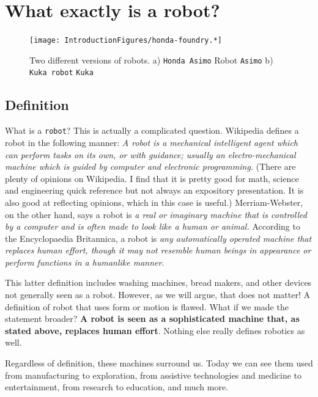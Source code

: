 \hypertarget{what-exactly-is-a-robot}{%
\section{What exactly is a robot?}\label{what-exactly-is-a-robot}}

\begin{figure}
\centering
\texttt{[image: IntroductionFigures/honda-foundry.*]}
\caption{Two different versions of robots. a) \texttt{Honda\ Asimo}
Robot \texttt{Asimo} b) \texttt{Kuka\ robot} \texttt{Kuka}}
\end{figure}

\hypertarget{definition}{%
\subsection{Definition}\label{definition}}

What is a \texttt{robot}? This is actually a complicated question.
Wikipedia defines a robot in the following manner: \emph{A robot is a
mechanical intelligent agent which can perform tasks on its own, or with
guidance; usually an electro-mechanical machine which is guided by
computer and electronic programming.} (There are plenty of opinions on
Wikipedia. I find that it is pretty good for math, science and
engineering quick reference but not always an expository presentation.
It is also good at reflecting opinions, which in this case is useful.)
Merriam-Webster, on the other hand, says a robot is \emph{a real or
imaginary machine that is controlled by a computer and is often made to
look like a human or animal.} According to the Encyclopaedia Britannica,
a robot is \emph{any automatically operated machine that replaces human
effort, though it may not resemble human beings in appearance or perform
functions in a humanlike manner}.

This latter definition includes washing machines, bread makers, and
other devices not generally seen as a robot. However, as we will argue,
that does not matter! A definition of robot that uses form or motion is
flawed. What if we made the statement broader? \textbf{A robot is seen
as a sophisticated machine that, as stated above, replaces human
effort}. Nothing else really defines robotics as well.

Regardless of definition, these machines surround us. Today we can see
them used from manufacturing to exploration, from assistive technologies
and medicine to entertainment, from research to education, and much
more.

